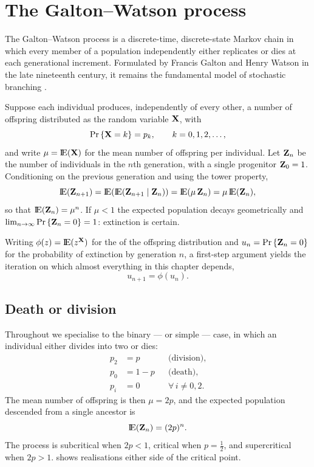 \section{The Galton--Watson process}
\label{sec:gw}

The Galton--Watson process is a discrete-time, discrete-state Markov chain in which
every member of a population independently either replicates or dies at each
generational increment. Formulated by Francis Galton and Henry Watson in the late
nineteenth century, it remains the fundamental model of stochastic branching
\cite{Athreya1972,Harris1963}.

Suppose each individual produces, independently of every other, a number of offspring
distributed as the random variable ${\bf X}$, with
\begin{equation*}
{\text{Pr}\left\{{\bf X}= k\right\}} = p_k,\qquad k = 0,1,2,\dots,
\end{equation*}
and write $\mu = {\rm I}\!{\rm E}({\bf X})$ for the mean number of offspring per individual. Let
${\bf Z}_n$ be the number of individuals in the $n$th generation, with a single progenitor
${\bf Z}_0=1$. Conditioning on the previous generation and using the tower property,
\begin{equation*}
{\rm I}\!{\rm E}({\bf Z}_{n+1}) = {\rm I}\!{\rm E}({\rm I}\!{\rm E}({\bf Z}_{n+1}\mid {\bf Z}_n)) = {\rm I}\!{\rm E}(\mu\,{\bf Z}_n) = \mu\,{\rm I}\!{\rm E}({\bf Z}_n),
\end{equation*}
so that ${\rm I}\!{\rm E}({\bf Z}_n) = \mu^n$. If $\mu<1$ the expected population decays geometrically
and $\lim_{n\to\infty}{\text{Pr}\left\{{\bf Z}_n=0\right\}}=1$: extinction is certain.

Writing $\phi(z) = {\rm I}\!{\rm E}(z^{{\bf X}})$ for the \pgf{} of the offspring distribution and
$u_n = {\text{Pr}\left\{{\bf Z}_n = 0\right\}}$ for the probability of extinction by generation $n$, a
first-step argument yields the iteration on which almost everything in this chapter
depends,
\begin{equation}
\label{iterPGF}
u_{n+1} = \phi(u_n).
\end{equation}

\subsection{Death or division}
\label{sec:deathordivision}

Throughout we specialise to the binary --- or simple --- case, in which an individual
either divides into two or dies:
\begin{align*}
p_2 &= p &&\text{(division)},\\
p_0 &= 1-p &&\text{(death)},\\
p_i &= 0 &&\forall\, i\neq 0,2.
\end{align*}
The mean number of offspring is then $\mu = 2p$, and the expected population descended
from a single ancestor is
\begin{equation}
\label{eq:meanZn}
{\rm I}\!{\rm E}({\bf Z}_n) = (2p)^n.
\end{equation}
The process is subcritical when $2p<1$, critical when $p=\tfrac12$, and supercritical
when $2p>1$.  shows realisations either side of the critical point.

